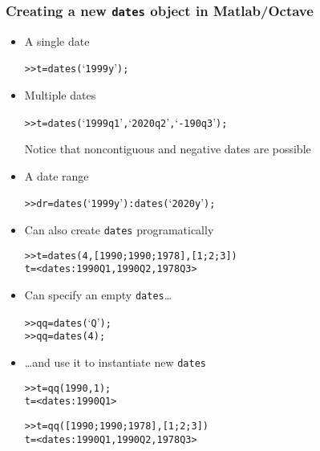 \documentclass[10pt]{beamer}
\newcommand{\myitem}{\item[$\bullet$]}
\begin{document}
\begin{frame}[fragile,t]
  \frametitle{Creating a new \texttt{dates} object in Matlab/Octave}
  \begin{itemize}
    \myitem{A single date}
\begin{alltt}
  >> t = dates(`1999y');
\end{alltt}
    \myitem{Multiple dates}
\begin{alltt}
  >> t = dates(`1999q1', `2020q2', `-190q3');
\end{alltt}
Notice that noncontiguous and negative dates are possible
    \myitem{A date range}
\begin{alltt}
  >> dr = dates(`1999y'):dates(`2020y');
\end{alltt}
    \myitem Can also create \texttt{dates} programatically
\begin{alltt}
  >> t = dates(4, [1990; 1990; 1978], [1; 2; 3])
  t = <dates: 1990Q1, 1990Q2, 1978Q3>
\end{alltt}
    \myitem Can specify an empty \texttt{dates}\dots
\begin{alltt}
  >> qq = dates(`Q');
  >> qq = dates(4);
\end{alltt}
    \myitem \dots and use it to instantiate new \texttt{dates}
\begin{alltt}
  >> t = qq(1990, 1);
  t = <dates: 1990Q1>
\end{alltt}
\begin{alltt}
  >> t = qq([1990; 1990; 1978], [1; 2; 3])
  t = <dates: 1990Q1, 1990Q2, 1978Q3>
\end{alltt}
  \end{itemize}
\end{frame}
\end{document}
